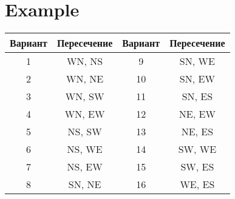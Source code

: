 \documentclass{article}
\begin{document}
\section{Example}\label{sec:example}

\begin{center}
  \begin{tabular}{| c | c || c | c |}
    \hline
      \textbf{Вариант}  & \textbf{Пересечение}  & \textbf{Вариант}  & \textbf{Пересечение}   \\
    \hline
       1   &  WN, NS   &  9   &  SN, WE  \\
    \hline
       2   &  WN, NE   &  10   &  SN, EW  \\
    \hline
       3   &  WN, SW   &  11   &  SN, ES  \\
    \hline
       4   &  WN, EW   &  12   &  NE, EW  \\
    \hline
       5   &  NS, SW   &  13   &  NE, ES  \\
    \hline
       6   &  NS, WE   &  14   &  SW, WE  \\
    \hline
       7   &  NS, EW   &  15   &  SW, ES  \\
    \hline
       8   &  SN, NE   &  16   &  WE, ES  \\
    \hline
      \end{tabular}
\end{center}
\end{document}
